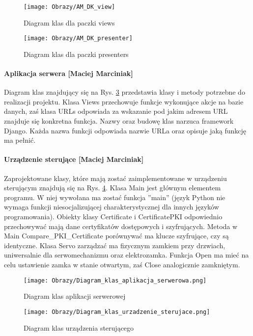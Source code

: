 	\newpage
\begin{figure}[ht!]
	\centering
	\texttt{[image: Obrazy/AM\_DK\_view]}
	\caption{Diagram klas dla paczki views}
	\label{Diagram klas dla paczki views}
\end{figure}
\newpage

		\begin{figure}[ht!]
			\centering
			\texttt{[image: Obrazy/AM\_DK\_presenter]}
			\caption{Diagram klas dla paczki presenters}
			\label{Diagram klas dla paczki presenters}
		\end{figure}
		\newpage		

	\paragraph*{Aplikacja serwera [Maciej Marciniak]}
	Diagram klas znajdujący się na Rys. \ref{diagram:Diagram_klas_aplikacji_serwerowej} przedstawia klasy i metody potrzebne do realizacji projektu. Klasa Views przechowuje funkcje wykonujące akcje na bazie danych, zaś klasa URLs odpowiada za wskazanie pod jakim adresem URL znajduje się konkretna funkcja. Nazwy oraz budowę klas narzuca framework Django. Każda nazwa funkcji odpowiada nazwie URLa oraz opisuje jaką funkcję ma pełnić.
	
	\paragraph*{Urządzenie sterujące [Maciej Marciniak]}
	Zaprojektowane klasy, które mają zostać zaimplementowane w urządzeniu sterującym znajdują się na Rys. \ref{diagram:Diagram_klas_urzadzenia_sterujacego}. Klasa Main jest głównym elementem programu. W niej wywołana ma zostać funkcja ''main'' (język Python nie wymaga funkcji niesocjalizującej charakterystycznej dla innych języków programowania). Obiekty klasy Certificate i CertificatePKI odpowiednio przechowywać mają dane certyfikatów dostępowych i szyfrujących. Metoda w Main Compare\_PKI\_Certificate porównywać ma klucze szyfrujące, czy są identyczne. Klasa Servo zarządzać ma fizycznym zamkiem przy drzwiach, uniwersalnie dla serwomechanizmu oraz elektrozamka. Funkcja Open ma mieć na celu ustawienie zamka w stanie otwartym, zaś Close analogicznie zamkniętym. 
	
	
		\begin{landscape}
		\begin{figure}[!h]
			\centering
			\vspace{2.5cm}
			\texttt{[image: Obrazy/Diagram\_klas\_aplikacja\_serwerowa.png]}
			\caption{Diagram klas aplikacji serwerowej}
			\label{diagram:Diagram_klas_aplikacji_serwerowej}
		\end{figure}	
	\end{landscape}
\begin{landscape}
		\begin{figure}[!h]
			\centering
			\vspace{-1.5cm}
			\texttt{[image: Obrazy/Diagram\_klas\_urzadzenie\_sterujace.png]}
			\caption{Diagram klas urządzenia sterującego}
			\label{diagram:Diagram_klas_urzadzenia_sterujacego}
		\end{figure}
	\end{landscape}
			
